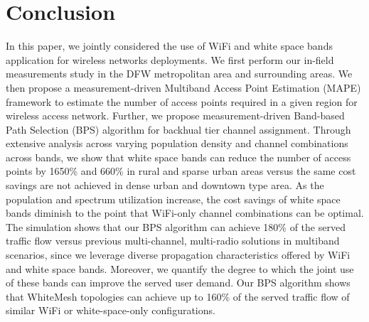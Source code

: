 \section{Conclusion}
\label{sec:conclusion}
In this paper, we jointly considered the use of WiFi and white space bands application
for wireless networks deployments. 
We first perform our in-field measurements study in the DFW metropolitan area and surrounding 
areas. We then propose a measurement-driven Multiband Access Point Estimation 
(MAPE) framework to estimate the number of access points required in a given region for 
wireless access network. Further, we propose measurement-driven Band-based Path Selection (BPS) algorithm 
for backhual tier channel assignment. 
%
Through extensive analysis across varying population density and channel combinations across bands, 
we show that white space bands can reduce the number of access points by 1650\%
and 660\% in rural and sparse urban areas versus the same cost savings are not achieved in dense urban 
and downtown type area. As the population and spectrum utilization increase, the cost savings of 
white space bands diminish to the point that WiFi-only channel combinations can be optimal.
The simulation shows that our BPS algorithm can achieve 180\% of the served traffic flow versus previous 
multi-channel, multi-radio solutions in multiband scenarios, since we leverage diverse propagation 
characteristics offered by WiFi and white space bands. Moreover, we quantify the degree to which the joint 
use of these bands can improve the served user demand. Our BPS algorithm shows that WhiteMesh topologies 
can achieve up to 160\% of the served traffic flow of similar WiFi or white-space-only configurations.



